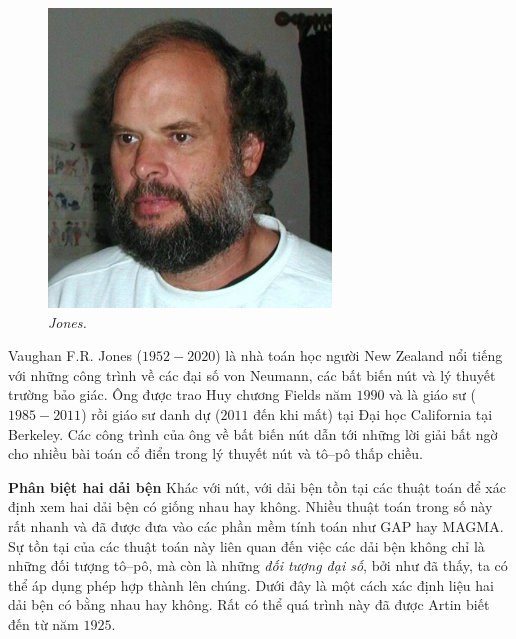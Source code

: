 \begin{multicols}{2}
	\vspace*{-8pt}
	\begin{tBox}
		\begin{figure}
			\vspace*{-15pt}
			\centering
			\captionsetup{labelformat= empty, justification=centering}
			\hspace*{-10pt}\includegraphics[width= 1.1\linewidth]{fig_Jones}
			\caption{\small\textit{\color{duongvaotoanhoc}Jones.}}
			\vspace*{-15pt}
		\end{figure}
		Vaughan F.R. Jones ($1952-2020$) là nhà toán học người New Zealand nổi tiếng với những công trình về các đại số von Neumann, các bất biến nút và lý thuyết trường bảo giác. Ông được trao Huy chương Fields năm $1990$ và là giáo sư ($1985-2011$) rồi giáo sư danh dự ($2011$ đến khi mất) tại Đại học California tại Berkeley. Các công trình của ông về bất biến nút dẫn tới những lời giải bất ngờ cho nhiều bài toán cổ điển trong lý thuyết nút và tô--pô thấp chiều.
	\end{tBox}
	\vskip 0.05cm
	\textbf{\color{duongvaotoanhoc}Phân biệt hai dải bện}
	\vskip 0.1cm
	Khác với nút, với dải bện tồn tại các thuật toán để xác định xem hai dải bện có giống nhau hay không. Nhiều thuật toán trong số này rất nhanh và đã được đưa vào các phần mềm tính toán như GAP hay MAGMA. Sự tồn tại của các thuật toán này liên quan đến việc các dải bện không chỉ là những đối tượng tô--pô, mà còn là những \textit{đối tượng đại số}, bởi như đã thấy, ta có thể áp dụng phép hợp thành lên chúng. Dưới đây là một cách xác định liệu hai dải bện có bằng nhau hay không. Rất có thể quá trình này đã được Artin biết đến từ năm $1925$.

\end{multicols}
